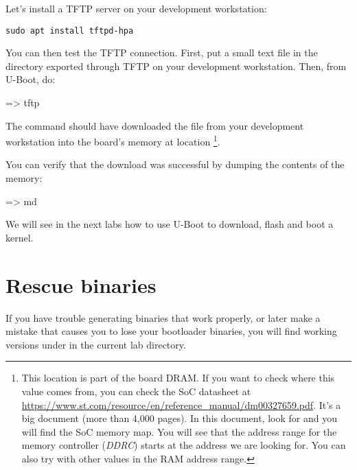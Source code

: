 Let's install a TFTP server on your development workstation:

\begin{verbatim}
sudo apt install tftpd-hpa
\end{verbatim}

You can then test the TFTP connection. First, put a small text file in
the directory exported through TFTP on your development
workstation. Then, from U-Boot, do:

\begin{ubootinput}
=> tftp %
\end{ubootinput}

The  command should have downloaded the
 file from your development workstation into
the board's memory at location {\tt \zimageboardaddr}\footnote{
This location is part of the board DRAM. If you want
to check where this value comes from, you can check the SoC
datasheet at
\url{https://www.st.com/resource/en/reference_manual/dm00327659.pdf}.
It's a big document (more than 4,000 pages). In this document, look
for  and you will find the SoC memory map.
You will see that the address range for the memory controller
({\em DDRC})
starts at the address we are looking for.
You can also try with other values in the RAM address range.}.

You can verify that the download was successful by dumping the
contents of the memory:

\begin{ubootinput}
=> md %
\end{ubootinput}

We will see in the next labs how to use U-Boot to download, flash and
boot a kernel.

\section{Rescue binaries}

If you have trouble generating binaries that work properly, or later
make a mistake that causes you to lose your bootloader binaries, you
will find working versions under  in the current lab
directory.
